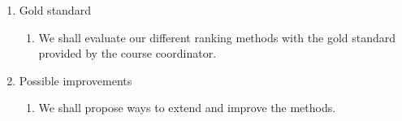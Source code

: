 \begin{enumerate}
\begin{enumerate}
\end{enumerate}
\item{Gold standard}
\begin{enumerate}
\item{We shall evaluate our different ranking methods with the gold standard provided by the course coordinator.}
\end{enumerate}
\item{Possible improvements}
\begin{enumerate}
\item{We shall propose ways to extend and improve the methods.}
\end{enumerate}
\end{enumerate}
